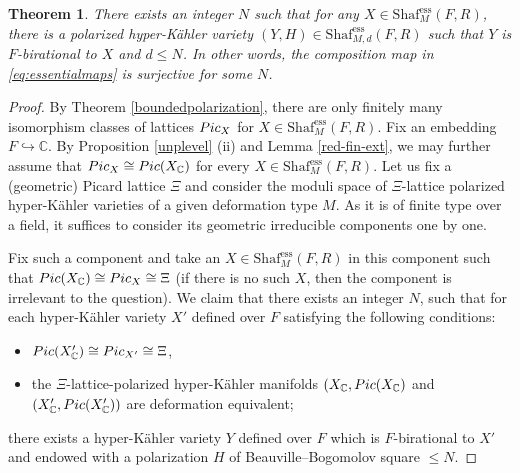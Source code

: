 \documentclass[11pt,reqno,oneside]{amsart}
\numberwithin{equation}{section}
\newtheorem{theorem}{Theorem}[section]
\theoremstyle{definition}
\DeclareMathOperator{\ess}{ess}
\newcommand{\Pic}{{\rm Pic}}
\newcommand{\Sha}{\mathrm{Shaf}}
\newcommand{\CC}{\mathbb{C}}
\begin{document}
\begin{theorem}\label{finbirsh} 
There exists an integer $N$ such that for any $X\in \Sha_{M}^{\ess}(F,R)$,  there is a polarized hyper-Kähler variety $(Y,H)\in \Sha_{M,d}^{\ess}(F,R) $ such that $Y$ is $F$-birational to $X$ and $d\leq N$. In other words, the composition map in \eqref{eq:essentialmaps} is surjective for some $N$.
\end{theorem}
\begin{proof}
By Theorem \ref{boundedpolarization}, there are only finitely many isomorphism classes of lattices $\Pic_X$  for $X\in \Sha_{M}^{\ess}(F,R)$.  Fix an embedding $F\hookrightarrow \CC$.  By  Proposition \ref{unplevel} (ii) and Lemma \ref{red-fin-ext},  we may further assume that $\Pic_X\cong \Pic(X_{\CC})$ for every $X\in \Sha_M^{\ess}(F,R)$. 
Let us fix a (geometric) Picard lattice $\Xi$ and consider the moduli space of  $\Xi$-lattice polarized hyper-Kähler varieties of a given deformation type $M$. As it is of finite type over a field, it suffices to consider its geometric irreducible components one by one.

Fix such a component and take an $X\in \Sha_{M}^{\ess}(F,R)$ in this component such that $\Pic(X_\CC)\cong \Pic_X \cong\Xi$ (if there is no such $X$, then the component is irrelevant to the question). 
We claim that there exists an integer $N$, such that for each hyper-Kähler variety $X'$ defined over $F$ satisfying the following conditions:
\begin{itemize}
    \item $\Pic(X'_\CC)\cong \Pic_{X'}\cong \Xi$,
    \item the $\Xi$-lattice-polarized hyper-Kähler manifolds $(X_\CC, \Pic(X_\CC)$ and $(X'_\CC, \Pic(X'_\CC))$ are deformation equivalent; 
\end{itemize}
there exists a hyper-Kähler variety  $Y$ defined over $F$ which is $F$-birational to $X'$ and endowed with a polarization $H$ of Beauville--Bogomolov square $\leq N$. 


\end{proof}
\end{document}
